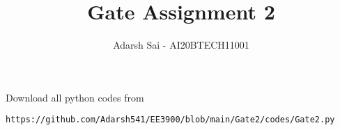 \documentclass[journal,12pt,twocolumn]{IEEEtran}
\DeclareMathOperator*{\Res}{Res}
\begin{document}
\newcommand{\BEQA}{\begin{eqnarray}}
\newcommand{\EEQA}{\end{eqnarray}}
\newcommand{\define}{\stackrel{\triangle}{=}}

\raggedbottom
\setlength{\parindent}{0pt}
\providecommand{\mbf}{\mathbf}
\providecommand{\pr}[1]{\ensuremath{\Pr\left(#1\right)}}
\providecommand{\qfunc}[1]{\ensuremath{Q\left(#1\right)}}
\providecommand{\sbrak}[1]{\ensuremath{{}\left[#1\right]}}
\providecommand{\lsbrak}[1]{\ensuremath{{}\left[#1\right.}}
\providecommand{\rsbrak}[1]{\ensuremath{{}\left.#1\right]}}
\providecommand{\brak}[1]{\ensuremath{\left(#1\right)}}
\providecommand{\lbrak}[1]{\ensuremath{\left(#1\right.}}
\providecommand{\rbrak}[1]{\ensuremath{\left.#1\right)}}
\providecommand{\cbrak}[1]{\ensuremath{\left\{#1\right\}}}
\providecommand{\lcbrak}[1]{\ensuremath{\left\{#1\right.}}
\providecommand{\rcbrak}[1]{\ensuremath{\left.#1\right\}}}
\theoremstyle{remark}
\newtheorem{rem}{Remark}
\newcommand{\sgn}{\mathop{\mathrm{sgn}}}
\providecommand{\abs}[1]{\vert#1\vert}
\providecommand{\res}[1]{\Res\displaylimits_{#1}} 
\providecommand{\norm}[1]{\lVert#1\rVert}
\providecommand{\mtx}[1]{\mathbf{#1}}
\providecommand{\mean}[1]{E[ #1 ]}
\providecommand{\fourier}{\overset{\mathcal{F}}{ \rightleftharpoons}}
\providecommand{\system}{\overset{\mathcal{H}}{ \longleftrightarrow}}
\newcommand{\solution}{\noindent \textbf{Solution: }}
\newcommand{\cosec}{\,\text{cosec}\,}
\providecommand{\dec}[2]{\ensuremath{\overset{#1}{\underset{#2}{\gtrless}}}}
\newcommand{\myvec}[1]{\ensuremath{\begin{pmatrix}#1\end{pmatrix}}}
\newcommand{\mydet}[1]{\ensuremath{\begin{vmatrix}#1\end{vmatrix}}}
\makeatletter
{}
\makeatother
\let\StandardTheFigure\thefigure
\let\vec\mathbf
\renewcommand{\thefigure}{\theproblem}
\def\putbox#1#2#3{\makebox[0in][l]{\makebox[#1][l]{}\raisebox{\baselineskip}[0in][0in]{\raisebox{#2}[0in][0in]{#3}}}}
     \def\rightbox#1{\makebox[0in][r]{#1}}
     \def\centbox#1{\makebox[0in]{#1}}
     \def\topbox#1{\raisebox{-\baselineskip}[0in][0in]{#1}}
     \def\midbox#1{\raisebox{-0.5\baselineskip}[0in][0in]{#1}}
\vspace{3cm}
\title{Gate Assignment 2}
\author{Adarsh Sai - AI20BTECH11001}
\maketitle
\newpage
\bigskip
\renewcommand{\thefigure}{\theenumi}
\renewcommand{\thetable}{\theenumi}
Download all python codes from 
\begin{lstlisting}
https://github.com/Adarsh541/EE3900/blob/main/Gate2/codes/Gate2.py
\end{lstlisting}
\end{document}

